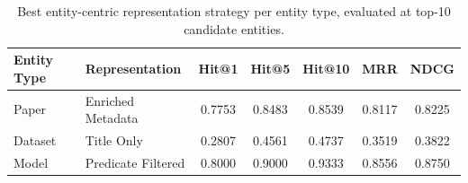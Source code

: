 \begin{table}[ht]
  \centering
  \small
  \caption{Best entity-centric representation strategy per entity type, evaluated at top-10 candidate entities.}
  \label{tab:best_representation_by_entity}
  \begin{tabular}{llccccc}
    \toprule
    \textbf{Entity Type} & \textbf{Representation} & \textbf{Hit@1} & \textbf{Hit@5} & \textbf{Hit@10} & \textbf{MRR} & \textbf{NDCG} \\
    \midrule
    Paper & Enriched Metadata & 0.7753 & 0.8483 & 0.8539 & 0.8117 & 0.8225 \\
    Dataset & Title Only & 0.2807 & 0.4561 & 0.4737 & 0.3519 & 0.3822 \\
    Model & Predicate Filtered & 0.8000 & 0.9000 & 0.9333 & 0.8556 & 0.8750 \\
    \bottomrule
  \end{tabular}
\end{table}